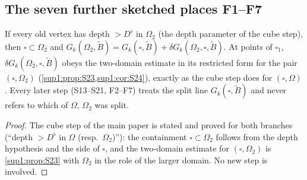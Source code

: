 
\subsection{The seven further sketched places F1--F7}\label{sup4:ssec:F}

\begin{lemma}\label{sup4:lem:F1}
If every old vertex has depth $>D^\flat$ in $\Omega_2$ (the depth parameter of the cube step), then $\square\subset\Omega_2$ and $G_k(\Omega_2,\tilde B)=G_k(\square,\tilde B)+\delta G_k(\Omega_2,\square,\tilde B)$. At points of $\square_1$, $\delta G_k(\Omega_2,\square,\tilde B)$ obeys the two-domain estimate \cite[(2.26)]{Ba1} in its restricted form for the pair $(\square,\Omega_2)$ (\cref{sup1:prop:S23,sup1:cor:S24}), exactly as the cube step does for $(\square,\Omega)$. Every later step (S13--S21, F2--F7) treats the split line $G_k(\square,\tilde B)$ and never refers to which of $\Omega$, $\Omega_2$ was split.
\end{lemma}

\begin{proof}
The cube step of the main paper is stated and proved for both branches (``depth $>D^\flat$ in $\Omega$ (resp.\ $\Omega_2$)''): the containment $\square\subset\Omega_2$ follows from the depth hypothesis and the side of $\square$, and the two-domain estimate for $(\square,\Omega_2)$ is \cref{sup1:prop:S23} with $\Omega_2$ in the role of the larger domain. No new step is involved.
\end{proof}

